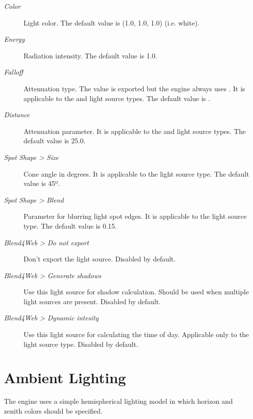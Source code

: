 \documentclass[a4paper,12pt,oneside]{sphinxmanual}
\begin{document}
\begin{DUlineblock}{0em}
\item[] 
\end{DUlineblock}
\begin{description}
\item[{\emph{Color}}] \leavevmode
Light color. The default value is (1.0, 1.0, 1.0) (i.e. white).

\item[{\emph{Energy}}] \leavevmode
Radiation intensity. The default value is 1.0.

\item[{\emph{Falloff}}] \leavevmode
Attenuation type. The value is exported but the engine always uses . It is applicable to the  and  light source types. The default value is .

\item[{\emph{Distance}}] \leavevmode
Attenuation parameter. It is applicable to the  and  light source types. The default value is 25.0.

\item[{\emph{Spot Shape \textgreater{} Size}}] \leavevmode
Cone angle in degrees. It is applicable to the  light source type. The default value is 45º.

\item[{\emph{Spot Shape \textgreater{} Blend}}] \leavevmode
Parameter for blurring light spot edges. It is applicable to the  light source type. The default value is 0.15.

\item[{\emph{Blend4Web \textgreater{} Do not export}}] \leavevmode
Don't export the light source. Disabled by default.

\item[{\emph{Blend4Web \textgreater{} Generate shadows}}] \leavevmode
Use this light source for shadow calculation. Should be used when multiple light sources are present. Disabled by default.

\item[{\emph{Blend4Web \textgreater{} Dynamic intesity}}] \leavevmode
Use this light source for calculating the time of day. Applicable only to the  light source type. Disabled by default.

\end{description}


\section{Ambient Lighting}
\label{lighting:id5}
The engine uses a simple hemispherical lighting model in which horizon and zenith colors should be specified.
\end{document}
